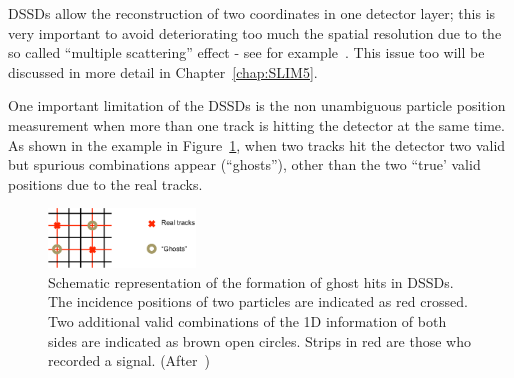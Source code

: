   DSSDs allow the reconstruction of two coordinates in one detector layer; 
 this is very important to avoid deteriorating too much the spatial resolution 
 due to the so called ``multiple scattering'' effect - see for example~\cite{pdg}. This issue too 
 will be discussed in more detail in Chapter~\ref{chap:SLIM5}.

One important limitation of the DSSDs is the non unambiguous particle position measurement when 
more than one track is hitting the detector at the same time. As shown in the example 
in Figure~\ref{fig:ghosts}, when two tracks hit the detector two valid but spurious combinations 
appear (``ghosts''),  other than the two ``true' valid positions due to the real tracks.

  \begin{figure}[htbp]
   \centering
  \includegraphics[width=0.35\textwidth]{ghosts.pdf} 
      \caption{\label{fig:ghosts} Schematic representation of the formation of ghost hits in 
     DSSDs. The incidence positions of two particles are indicated as  red 
      crossed. Two additional valid combinations of the 1D information of both sides are indicated 
      as brown open circles. Strips in red are those who recorded a signal. (After~\cite{Krammer})}
\end{figure}



